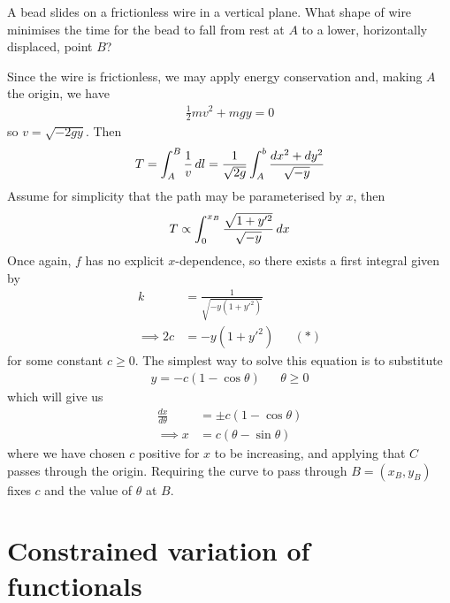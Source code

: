 \documentclass{../template/note}
\begin{document}
    \begin{example*}
        A bead slides on a frictionless wire in a vertical plane. What shape of wire minimises the time for the bead to fall from rest at $A$ to a lower, horizontally displaced, point $B$?

        Since the wire is frictionless, we may apply energy conservation and, making $A$ the origin, we have
        \begin{align*}
            \frac 1 2 mv^2 + mgy = 0
        \end{align*}
        so $v = \sqrt{-2gy}$. Then
        \begin{align*}
            T = \int_A^B \frac 1 v \,d{l} = \frac 1 {\sqrt{2g}} \int_A^b \frac{dx^2+dy^2}{\sqrt{-y}}
        \end{align*}
        Assume for simplicity that the path may be parameterised by $x$, then
        \begin{align*}
            T \propto \int_0^{x_B} \frac{\sqrt{1+y'^2}}{\sqrt{-y}} \,d{x}
        \end{align*}
        Once again, $f$ has no explicit $x$-dependence, so there exists a first integral given by
        \begin{align*}
            k &= \frac{1}{\sqrt{-y(1+y'^2)}} \\
            \implies 2c &= -y(1+y'^2) && (*)
        \end{align*}
        for some constant $c \geq 0$. The simplest way to solve this equation is to substitute
        \begin{align*}
            y = -c(1-\cos \theta) && \theta \geq 0
        \end{align*}
        which will give us
        \begin{align*}
            \frac{dx}{d\theta} &= \pm c(1-\cos \theta) \\
            \implies x &= c(\theta - \sin \theta)
        \end{align*}
        where we have chosen $c$ positive for $x$ to be increasing, and applying that $C$ passes through the origin. Requiring the curve to pass through $B = (x_B, y_B)$ fixes $c$ and the value of $\theta$ at $B$.
    \end{example*}
    
    \section{Constrained variation of functionals}
\end{document}
